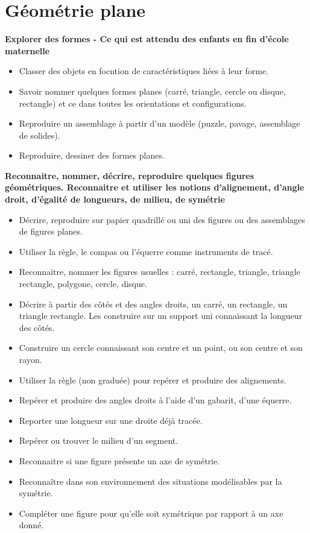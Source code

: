 \chapter{Géométrie plane} \label{Geo5}

\begin{prerequis}
\small{\bf Explorer des formes - Ce qui est attendu des enfants en fin d'école maternelle}
   \begin{itemize}
      \item Classer des objets en focntion de caractéristiques liées à leur forme.
      \item Savoir nommer quelques formes planes (carré, triangle, cercle ou disque, rectangle) et ce dans toutes les orientations et configurations.
      \item Reproduire un assemblage à partir d'un modèle (puzzle, pavage, assemblage de solides).
      \item Reproduire, dessiner des formes planes.
   \end{itemize}
\end{prerequis}

\begin{prerequis}
\small      {\bf Reconnaitre, nommer, décrire, reproduire quelques figures géométriques. Reconnaitre et utiliser les notions d’alignement, d’angle droit, d’égalité de longueurs, de milieu, de symétrie}
   \begin{itemize}
      \item Décrire, reproduire sur papier quadrillé ou uni des figures ou des assemblages de figures planes.
      \item Utiliser la règle, le compas ou l’équerre comme instruments de tracé.
      \item Reconnaitre, nommer les figures usuelles : carré, rectangle, triangle, triangle rectangle, polygone, cercle, disque.
      \item Décrire à partir des côtés et des angles droits, un carré, un rectangle, un triangle rectangle. Les construire sur un support uni connaissant la longueur des côtés.
      \item Construire un cercle connaissant son centre et un point, ou son centre et son rayon.
      
      \item Utiliser la règle (non graduée) pour repérer et produire des alignements.
      \item Repérer et produire des angles droits à l’aide d’un gabarit, d’une équerre.
      \item Reporter une longueur sur une droite déjà tracée.
      \item Repérer ou trouver le milieu d’un segment.
      \item Reconnaitre si une figure présente un axe de symétrie.
      \item Reconnaître dans son environnement des situations modélisables par la symétrie.
      \item Compléter une figure pour qu’elle soit symétrique par rapport à un axe donné.
   \end{itemize}
\end{prerequis}

